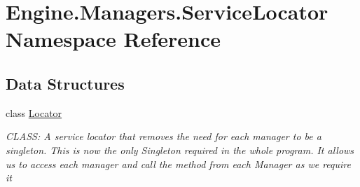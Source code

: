 \hypertarget{a00274}{}\section{Engine.\+Managers.\+Service\+Locator Namespace Reference}
\label{a00274}
\subsection*{Data Structures}
\begin{DoxyCompactItemize}
\item 
class \hyperlink{a00542}{Locator}
\begin{DoxyCompactList}\small\item\em C\+L\+A\+SS\+: A service locator that removes the need for each manager to be a singleton. This is now the only Singleton required in the whole program. It allows us to access each manager and call the method from each Manager as we require it \end{DoxyCompactList}\end{DoxyCompactItemize}
